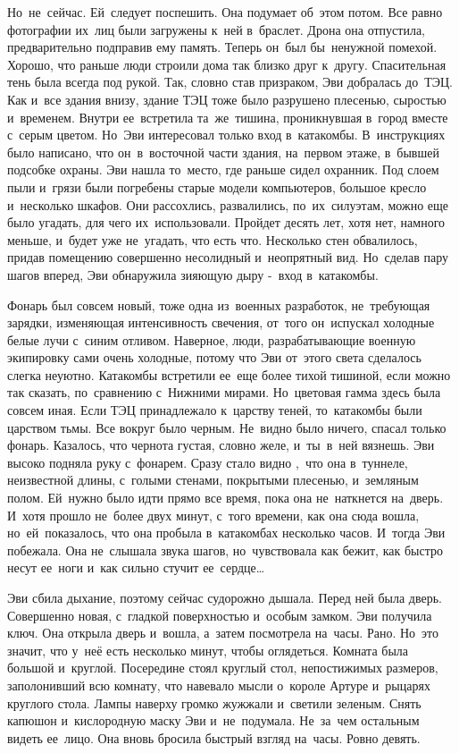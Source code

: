 Но~не~сейчас.
Ей~следует поспешить.
Она подумает об~этом потом.
Все равно фотографии их~лиц были загружены к~ней в~браслет.
Дрона она отпустила, предварительно подправив ему память.
Теперь он~был бы~ненужной помехой.
Хорошо, что раньше люди строили дома так близко друг к~другу.
Спасительная тень была всегда под рукой.
Так, словно став призраком, Эви добралась до~ТЭЦ.
Как и~все здания внизу, здание ТЭЦ тоже было разрушено плесенью, сыростью и~временем.
Внутри ее~встретила та~же~тишина, проникнувшая в~город вместе с~серым цветом.
Но~Эви интересовал только вход в~катакомбы.
В~инструкциях было написано, что он~в~восточной части здания, на~первом этаже, в~бывшей подсобке охраны.
Эви нашла то~место, где раньше сидел охранник.
Под слоем пыли и~грязи были погребены старые модели компьютеров, большое кресло и~несколько шкафов.
Они рассохлись, развалились, по~их~силуэтам, можно еще было угадать, для чего их~использовали.
Пройдет десять лет, хотя нет, намного меньше, и~будет уже не~угадать, что есть что.
Несколько стен обвалилось, придав помещению совершенно несолидный и~неопрятный вид.
Но~сделав пару шагов вперед, Эви обнаружила зияющую дыру -~вход в~катакомбы.
 
Фонарь был совсем новый, тоже одна из~военных разработок, не~требующая зарядки, изменяющая интенсивность свечения, от~того он~испускал холодные белые лучи с~синим отливом.
Наверное, люди, разрабатывающие военную экипировку сами очень холодные, потому что Эви от~этого света сделалось слегка неуютно.
Катакомбы встретили ее~еще более тихой тишиной, если можно так сказать, по~сравнению с~Нижними мирами.
Но~цветовая гамма здесь была совсем иная.
Если ТЭЦ принадлежало к~царству теней, то~катакомбы были царством тьмы.
Все вокруг было черным.
Не~видно было ничего, спасал только фонарь.
Казалось, что чернота густая, словно желе, и~ты~в~ней вязнешь.
Эви высоко подняла руку с~фонарем.
Сразу стало видно ,~что она в~туннеле, неизвестной длины, с~голыми стенами, покрытыми плесенью, и~земляным полом.
Ей~нужно было идти прямо все время, пока она не~наткнется на~дверь.
И~хотя прошло не~более двух минут, с~того времени, как она сюда вошла, но~ей~показалось, что она пробыла в~катакомбах несколько часов.
И~тогда Эви побежала.
Она не~слышала звука шагов, но~чувствовала как бежит, как быстро несут ее~ноги и~как сильно стучит ее~сердце…
 
Эви сбила дыхание, поэтому сейчас судорожно дышала.
Перед ней была дверь.
Совершенно новая, с~гладкой поверхностью и~особым замком.
Эви получила ключ.
Она открыла дверь и~вошла, а~затем посмотрела на~часы.
Рано.
Но~это значит, что у~неё есть несколько минут, чтобы оглядеться.
Комната была большой и~круглой.
Посередине стоял круглый стол, непостижимых размеров, заполонивший всю комнату, что навевало мысли о~короле Артуре и~рыцарях круглого стола.
Лампы наверху громко жужжали и~светили зеленым.
Снять капюшон и~кислородную маску Эви и~не~подумала.
Не~за~чем остальным видеть ее~лицо.
Она вновь бросила быстрый взгляд на~часы.
Ровно девять.
 
